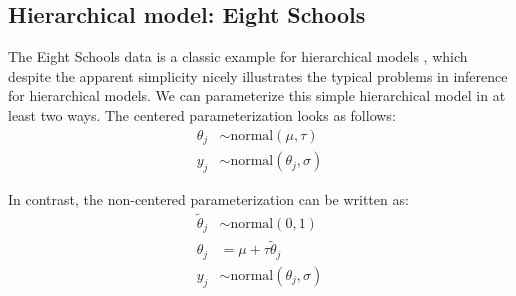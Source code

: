 \documentclass[american,]{article}
\begin{document}



\hypertarget{eightschools}{%
\subsection{Hierarchical model: Eight Schools}\label{eightschools}}

The Eight Schools data is a classic example for hierarchical models
\citep[see Section 5.5 in][]{BDA3}, which despite the apparent
simplicity nicely illustrates the typical problems in inference for
hierarchical models. We can parameterize this simple hierarchical model
in at least two ways. The centered parameterization looks as follows:
\begin{align*}
\theta_j &\sim \text{normal}(\mu, \tau) \\
y_j &\sim \text{normal}(\theta_j, \sigma)
\end{align*}

In contrast, the non-centered parameterization can be written as:
\begin{align*}
\tilde{\theta}_j &\sim \text{normal}(0, 1) \\
\theta_j &= \mu + \tau \tilde{\theta}_j \\
y_j &\sim \text{normal}(\theta_j, \sigma)
\end{align*}
\end{document}
